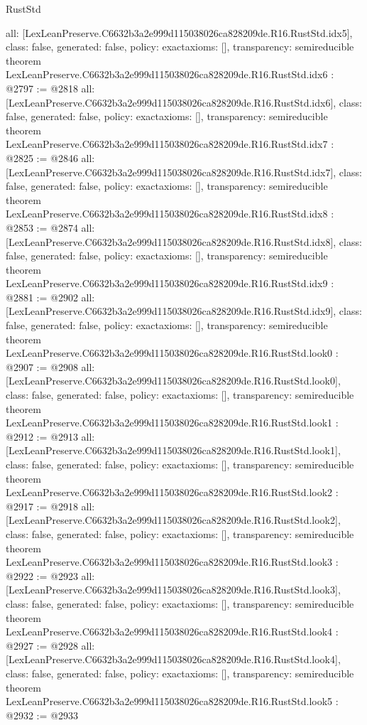 \begin{lexlean}{RustStd}
\begin{coremodule}
{  all: [LexLeanPreserve.C6632b3a2e999d115038026ca828209de.R16.RustStd.idx5],
  class: false,
  generated: false,
  policy: exact{axioms: []},
  transparency: semireducible
}
theorem LexLeanPreserve.C6632b3a2e999d115038026ca828209de.R16.RustStd.idx6 : @2797 := @2818 {
  all: [LexLeanPreserve.C6632b3a2e999d115038026ca828209de.R16.RustStd.idx6],
  class: false,
  generated: false,
  policy: exact{axioms: []},
  transparency: semireducible
}
theorem LexLeanPreserve.C6632b3a2e999d115038026ca828209de.R16.RustStd.idx7 : @2825 := @2846 {
  all: [LexLeanPreserve.C6632b3a2e999d115038026ca828209de.R16.RustStd.idx7],
  class: false,
  generated: false,
  policy: exact{axioms: []},
  transparency: semireducible
}
theorem LexLeanPreserve.C6632b3a2e999d115038026ca828209de.R16.RustStd.idx8 : @2853 := @2874 {
  all: [LexLeanPreserve.C6632b3a2e999d115038026ca828209de.R16.RustStd.idx8],
  class: false,
  generated: false,
  policy: exact{axioms: []},
  transparency: semireducible
}
theorem LexLeanPreserve.C6632b3a2e999d115038026ca828209de.R16.RustStd.idx9 : @2881 := @2902 {
  all: [LexLeanPreserve.C6632b3a2e999d115038026ca828209de.R16.RustStd.idx9],
  class: false,
  generated: false,
  policy: exact{axioms: []},
  transparency: semireducible
}
theorem LexLeanPreserve.C6632b3a2e999d115038026ca828209de.R16.RustStd.look0 : @2907 := @2908 {
  all: [LexLeanPreserve.C6632b3a2e999d115038026ca828209de.R16.RustStd.look0],
  class: false,
  generated: false,
  policy: exact{axioms: []},
  transparency: semireducible
}
theorem LexLeanPreserve.C6632b3a2e999d115038026ca828209de.R16.RustStd.look1 : @2912 := @2913 {
  all: [LexLeanPreserve.C6632b3a2e999d115038026ca828209de.R16.RustStd.look1],
  class: false,
  generated: false,
  policy: exact{axioms: []},
  transparency: semireducible
}
theorem LexLeanPreserve.C6632b3a2e999d115038026ca828209de.R16.RustStd.look2 : @2917 := @2918 {
  all: [LexLeanPreserve.C6632b3a2e999d115038026ca828209de.R16.RustStd.look2],
  class: false,
  generated: false,
  policy: exact{axioms: []},
  transparency: semireducible
}
theorem LexLeanPreserve.C6632b3a2e999d115038026ca828209de.R16.RustStd.look3 : @2922 := @2923 {
  all: [LexLeanPreserve.C6632b3a2e999d115038026ca828209de.R16.RustStd.look3],
  class: false,
  generated: false,
  policy: exact{axioms: []},
  transparency: semireducible
}
theorem LexLeanPreserve.C6632b3a2e999d115038026ca828209de.R16.RustStd.look4 : @2927 := @2928 {
  all: [LexLeanPreserve.C6632b3a2e999d115038026ca828209de.R16.RustStd.look4],
  class: false,
  generated: false,
  policy: exact{axioms: []},
  transparency: semireducible
}
theorem LexLeanPreserve.C6632b3a2e999d115038026ca828209de.R16.RustStd.look5 : @2932 := @2933 {
}
\end{coremodule}
\end{lexlean}
